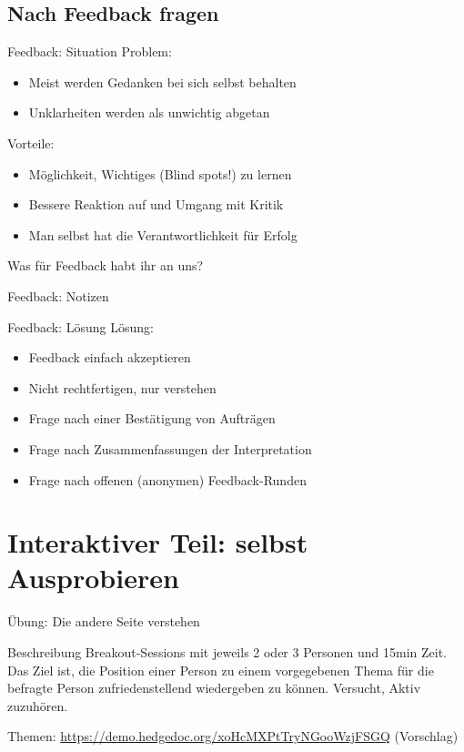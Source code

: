 \subsection{Nach Feedback fragen}

\begin{frame}[c]{Feedback: Situation}
    \large
    Problem:
    \begin{itemize}[<+(1)->]
        \item Meist werden Gedanken bei sich selbst behalten
        \item Unklarheiten werden als unwichtig abgetan
    \end{itemize}
    \pause
    Vorteile:
    \begin{itemize}[<+(1)->]
        \item Möglichkeit, Wichtiges (Blind spots!) zu lernen
        \item Bessere Reaktion auf und Umgang mit Kritik
        \item Man selbst hat die Verantwortlichkeit für Erfolg
    \end{itemize}
\end{frame}

\begin{frame}[standout]
    Was für Feedback habt ihr an uns?
\end{frame}

\begin{frame}[c]{Feedback: Notizen}
    
\end{frame}

\begin{frame}[c]{Feedback: Lösung}    
    \large
    Lösung:
    \begin{itemize}[<+(1)->]
        \item Feedback einfach akzeptieren
        \item Nicht rechtfertigen, nur verstehen
        \item Frage nach einer Bestätigung von Aufträgen
        \item Frage nach Zusammenfassungen der Interpretation
        \item Frage nach offenen (anonymen) Feedback-Runden
    \end{itemize}
\end{frame}





\section{Interaktiver Teil: selbst Ausprobieren}

\begin{frame}[c]{Übung: Die andere Seite verstehen}
    \large
    \begin{block}{Beschreibung}
    Breakout-Sessions mit jeweils 2 oder 3 Personen und 15min Zeit.
    Das Ziel ist, die Position einer Person zu einem vorgegebenen Thema
    für die befragte Person zufriedenstellend wiedergeben zu können.
    Versucht, Aktiv zuzuhören.
    \end{block}
    Themen: \url{https://demo.hedgedoc.org/xoHcMXPtTryNGooWzjFSGQ} (Vorschlag)
\end{frame}

